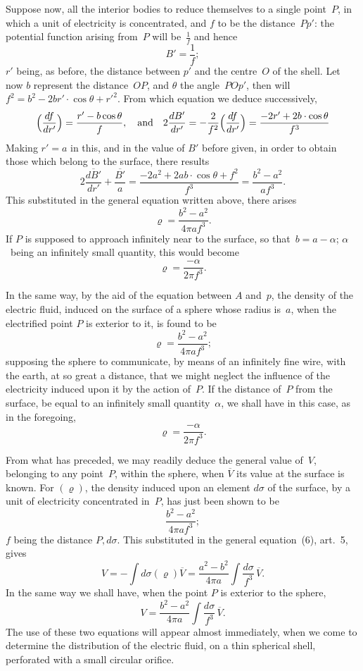 \documentclass[11pt,notitlepage]{amsart}
\renewcommand{\rho}{\varrho}
\begin{document}
Suppose now, all the interior bodies to reduce themselves to a single
point~$P$, in which a unit of electricity is concentrated, and $f$ to be the
distance~$Pp'$: the potential function arising from~$P$
will be~$\frac1f$ and hence
\[
B'=\frac1f;
\]
$r'$ being, as before, the distance between $p'$ and the centre~$O$
of the shell.
Let now $b$ represent the distance~$OP$,
and $\theta$ the angle~$POp'$, then will
$f^2=b^2-2br'\cdot\cos\theta+r'^2$.
From which equation we deduce successively,
\[
\Bigl(\frac{df}{dr'}\Bigr)=\frac{r'-b\cos\theta}{f},
\quad\text{and}\quad
2\frac{dB'}{dr'}=-\frac{2}{f^2}\Bigl(\frac{df}{dr'}\Bigr)
=\frac{-2r'+2b\cdot\cos\theta}{f^3}
\]
Making $r'=a$ in this, and in the value of $B'$ before given, in order to obtain those which belong to the surface, there results
\[
2\frac{\overline{dB'}}{dr'}+\frac{\overline{B'}}{a}=
\frac{-2a^2+2ab\cdot\cos\theta+f^2}{f^3}=
\frac{b^2-a^2}{af^3}.
\]
This substituted in the general equation written above, there arises
\[
\rho=\frac{b^2-a^2}{4\pi af^3}.
\]
If $P$ is supposed to approach infinitely near to the surface,
so that~${b=a-\alpha}$;
$\alpha$~being an infinitely small quantity, this would become
\[
\rho=\frac{-\alpha}{2\pi f^3}.
\]

In the same way, by the aid of the equation between $A$ and~$p$, the
density of the electric fluid, induced on the surface of a sphere whose radius
is~$a$, when the electrified point $P$ is exterior to it, is found to be
\[
\rho=\frac{b^2-a^2}{4\pi af^3};
\]
supposing the sphere to communicate, by means of an infinitely fine wire,
with the earth, at so great a distance, that we might neglect the influence
of the electricity induced upon it by the action of~$P$. If the distance of~$P$
from the surface,
be equal to an infinitely small quantity~$\alpha$, we shall have in
this case, as in the foregoing,
\[
\rho=\frac{-\alpha}{2\pi f^3}.
\]

From what has preceded, we may readily deduce the general value
of~$V$, belonging to any point~$P$, within the sphere,
when $\overline{V}$ its value at the
surface is known. For $(\rho)$, the density induced upon
an element $d\sigma$ of the
surface, by a unit of electricity concentrated in~$P$, has just been shown to be
\[
\frac{b^2-a^2}{4\pi af^3};
\]
$f$ being the distance $P,d\sigma$.
This substituted in the general equation~(6),
art.~5, gives
\[
\tag{10.}
V=-\int d\sigma(\rho)\overline{V}
=\frac{a^2-b^2}{4\pi a}\int\frac{d\sigma}{f^3}\,\overline{V}.
\]
In the same way we shall have, when the point $P$ is exterior to the sphere,
\[
\tag{11.}
V=\frac{b^2-a^2}{4\pi a}\int\frac{d\sigma}{f^3}\,\overline{V}.
\]
The use of these two equations will appear almost immediately, when we
come to determine the distribution of the electric fluid, on a thin spherical
shell, perforated with a small circular orifice.
\end{document}
